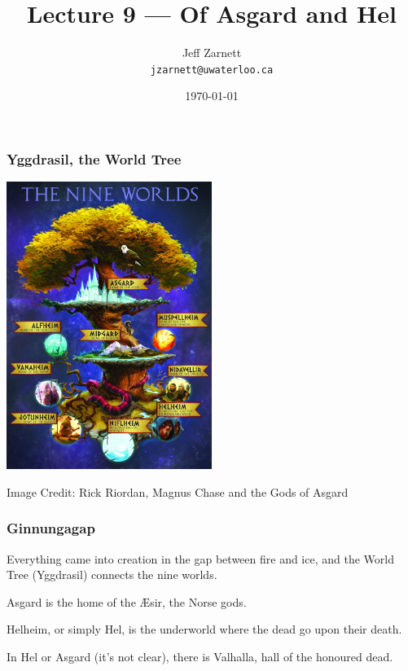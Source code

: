 

\title{Lecture 9 --- Of Asgard and Hel }

\author{Jeff Zarnett \\ \small \texttt{jzarnett@uwaterloo.ca}}
\date{\today}




\begin{frame}
	\titlepage

\end{frame}


\begin{frame}
	\frametitle{Yggdrasil, the World Tree}

	\begin{center}
		\includegraphics[width=0.5\textwidth]{images/Yggdrasil.jpg}
	\end{center}
	\hfill Image Credit: Rick Riordan, Magnus Chase and the Gods of Asgard
\end{frame}


\begin{frame}
	\frametitle{Ginnungagap}

	Everything came into creation in the gap between fire and ice, and the World Tree (Yggdrasil) connects the nine worlds.

	Asgard is the home of the \AE sir, the Norse gods.

	Helheim, or simply Hel, is the underworld where the dead go upon their death.

	In Hel or Asgard (it's not clear), there is Valhalla, hall of the honoured dead.

\end{frame}

